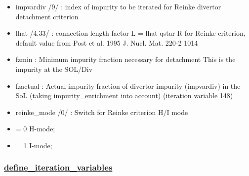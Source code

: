 \documentclass[]{article}
\providecommand{\tightlist}{%
  \setlength{\itemsep}{0pt}\setlength{\parskip}{0pt}}
\begin{document}
\begin{itemize}
\tightlist
\item
  impvardiv /9/ : index of impurity to be iterated for Reinke divertor
  detachment criterion
\item
  lhat /4.33/ : connection length factor L\textbar{}\textbar{} = lhat
  qstar R for Reinke criterion, default value from Post et al. 1995 J.
  Nucl. Mat. 220-2 1014
\item
  fzmin : Minimum impurity fraction necessary for detachment This is the
  impurity at the SOL/Div
\item
  fzactual : Actual impurity fraction of divertor impurity (impvardiv)
  in the SoL (taking impurity\_enrichment into account) (iteration
  variable 148)
\item
  reinke\_mode /0/ : Switch for Reinke criterion H/I mode
\item
  = 0 H-mode;
\item
  = 1 I-mode;
\end{itemize}

\subsubsection{\texorpdfstring{\href{define_iteration_variables.html}{define\_iteration\_variables}}{define\_iteration\_variables}}\label{define_iteration_variables}
\end{document}
